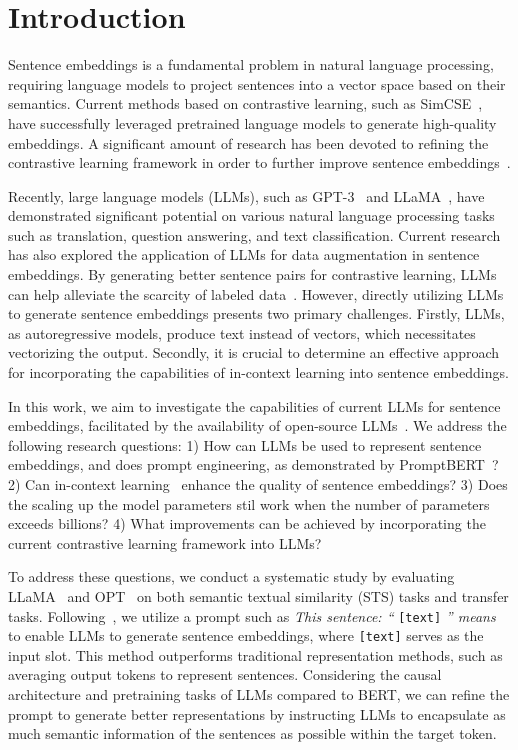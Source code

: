 \documentclass{article}
\begin{document}
\section{Introduction}
\label{sec:intro}

Sentence embeddings is a fundamental problem in natural language processing, requiring language models to project sentences into a vector space based on their semantics. Current methods based on contrastive learning, such as SimCSE~\cite{gao2021simcse}, have successfully leveraged pretrained language models to generate high-quality embeddings. A significant amount of research has been devoted to refining the contrastive learning framework in order to further improve sentence embeddings~\cite{chuang2022diffcse, wu2022pcl, wu-etal-2022-infocse, cheng2023improving}.

Recently, large language models (LLMs), such as GPT-3~\cite{gpt3} and LLaMA~\cite{touvron2023llama}, have demonstrated significant potential on various natural language processing tasks such as translation, question answering, and text classification.
Current research has also explored the application of LLMs for data augmentation in sentence embeddings. By generating better sentence pairs for contrastive learning, LLMs can help alleviate the scarcity of labeled data~\cite{cheng2023improving, zhang2023contrastive}.
However, directly utilizing LLMs to generate sentence embeddings presents two primary challenges.
Firstly, LLMs, as autoregressive models, produce text instead of vectors, which necessitates vectorizing the output. Secondly, it is crucial to determine an effective approach for incorporating the capabilities of in-context learning into sentence embeddings.

In this work, we aim to investigate the capabilities of current LLMs for sentence embeddings, facilitated by the availability of open-source LLMs~\cite{touvron2023llama, zhang2022opt}. We address the following research questions: 1) How can LLMs be used to represent sentence embeddings, and does prompt engineering, as demonstrated by PromptBERT~\cite{jiang2022promptbert}?
2) Can in-context learning~\cite{liu2023pre} enhance the quality of sentence embeddings?
3) Does the scaling up the model parameters stil work when the number of parameters exceeds billions?
4) What improvements can be achieved by incorporating the current contrastive learning framework into LLMs?

To address these questions, we conduct a systematic study by evaluating LLaMA~\cite{touvron2023llama} and OPT~\cite{zhang2022opt} on both semantic textual similarity (STS) tasks and transfer tasks. Following~\cite{jiang2022promptbert}, we utilize a prompt such as \textit{This sentence: ``} \texttt{[text]} \textit{'' means} to enable LLMs to generate sentence embeddings, where \texttt{[text]} serves as the input slot. This method outperforms traditional representation methods, such as averaging output tokens to represent sentences.
Considering the causal architecture and pretraining tasks of LLMs compared to BERT, we can refine the prompt to generate better representations by instructing LLMs to encapsulate as much semantic information of the sentences as possible within the target token.
\end{document}
